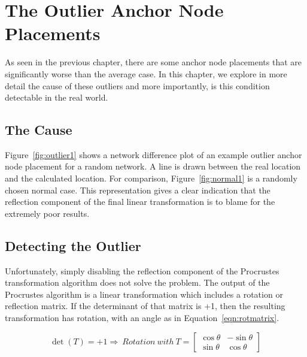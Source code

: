 \chapter{The Outlier Anchor Node Placements}
As seen in the previous chapter, there are some anchor node placements that are significantly worse than the average case.   In this chapter, we explore in more detail the cause of these outliers and more importantly, is this condition detectable in the real world.

\section{The Cause}
Figure~\ref{fig:outlier1} shows a network difference plot of an example outlier anchor node placement for a random network. A line is drawn between the real location and the calculated location.  For comparison, Figure~\ref{fig:normal1} is a randomly chosen normal case. This representation gives a clear indication that the reflection component of the final linear transformation is to blame for the extremely poor results.  

\begin{figure}
  \centering
	\label{fig:outliernetworkdiff}
	\caption{}
\end{figure}

\section{Detecting the Outlier}

Unfortunately, simply disabling the reflection component of the Procrustes transformation algorithm does not solve the problem.  The output of the Procrustes algorithm is a linear transformation which includes a rotation or reflection matrix.  If the determinant of that matrix is +1, then the resulting transformation has rotation, with an angle as in Equation~\ref{eqn:rotmatrix}.  

\begin{equation}
	\det{(T)}=+1 \Rightarrow ~Rotation ~with ~T=
	\begin{bmatrix}
	\cos{\theta} & -\sin{\theta} \\ 
	\sin{\theta} & \cos{\theta}\end{bmatrix}
	\label{eqn:rotmatrix} 
\end{equation}

